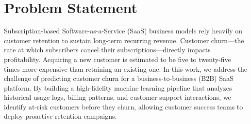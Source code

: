 \section{Problem Statement}
Subscription-based Software-as-a-Service (SaaS) business models rely heavily on customer retention to sustain long-term recurring revenue. Customer churn—the rate at which subscribers cancel their subscriptions—directly impacts profitability. Acquiring a new customer is estimated to be five to twenty-five times more expensive than retaining an existing one. In this work, we address the challenge of predicting customer churn for a business-to-business (B2B) SaaS platform. By building a high-fidelity machine learning pipeline that analyzes historical usage logs, billing patterns, and customer support interactions, we identify at-risk customers before they churn, allowing customer success teams to deploy proactive retention campaigns.
